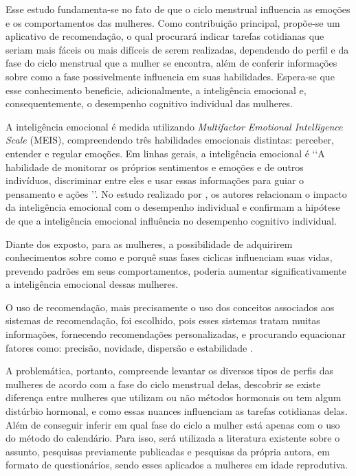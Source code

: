 Esse estudo fundamenta-se no fato de que o ciclo menstrual influencia as emoções e os comportamentos 
das mulheres. Como contribuição principal, propõe-se um aplicativo de recomendação, o qual procurará 
indicar tarefas cotidianas que seriam mais fáceis ou mais difíceis de serem realizadas, dependendo do 
perfil e da fase do ciclo menstrual que a mulher se encontra, além de conferir informações sobre como 
a fase possivelmente influencia em suas habilidades. Espera-se que esse conhecimento beneficie, 
adicionalmente, a inteligência emocional e, consequentemente, o desempenho cognitivo individual das 
mulheres. 

A inteligência emocional é medida utilizando \textit{Multifactor Emotional Intelligence Scale} (MEIS), 
compreendendo três habilidades emocionais distintas: perceber, entender e regular emoções. Em linhas 
gerais, a inteligência 
emocional é \lq \lq A habilidade de monitorar os próprios sentimentos e emoções e de outros indivíduos, 
discriminar entre eles e usar essas informações para guiar o pensamento e ações \rq \rq \cite{salovey1990}. 
No estudo realizado por , os autores relacionam o impacto da inteligência emocional 
com o desempenho individual e confirmam a hipótese de 
que a inteligência emocional influência no desempenho cognitivo individual. 

Diante dos exposto, para as mulheres, 
a possibilidade de adquirirem conhecimentos sobre como e porquê suas fases ciclicas influenciam suas vidas, 
prevendo padrões em seus comportamentos, poderia aumentar 
significativamente a inteligência emocional dessas mulheres. 


O uso de recomendação, mais precisamente o uso dos conceitos associados aos sistemas de recomendação, 
foi escolhido, pois esses sistemas tratam muitas informações, fornecendo recomendações personalizadas, 
e procurando equacionar fatores como: precisão, novidade, dispersão e estabilidade \cite{bobadilla2013}.


A problemática, portanto, compreende levantar os diversos tipos de perfis das mulheres de acordo com a 
fase do ciclo menstrual delas, descobrir se existe diferença entre mulheres que utilizam ou não métodos 
hormonais ou tem algum distúrbio hormonal, e como essas nuances influenciam as tarefas cotidianas delas. 
Além de conseguir inferir em qual fase do ciclo a mulher está apenas com o uso do método do calendário. 
Para isso, será utilizada a literatura existente sobre o assunto, pesquisas previamente publicadas e 
pesquisas da própria autora, em formato de questionários, sendo esses aplicados a mulheres em idade 
reprodutiva.


